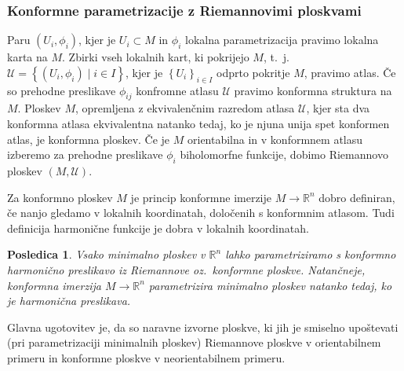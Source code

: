 \documentclass[8pt]{beamer}
\theoremstyle{definition}
\theoremstyle{remark}
\theoremstyle{plain}
\newtheorem{posledica}[definicija]{Posledica}
\numberwithin{equation}{section}  %
\begin{document}
\begin{frame}
    \frametitle{Konformne parametrizacije z Riemannovimi ploskvami}

    Paru $\left(U_i, \phi_i\right)$, kjer je $U_i \subset M$ in $\phi_i$ lokalna parametrizacija pravimo \textcolor{red1}{lokalna karta} na $M$. Zbirki vseh lokalnih kart, ki pokrijejo $M$, t.~j.~$\mathcal{U}=\left\{\left(U_i, \phi_i\right) \mid i \in I\right\}$, kjer je $\left\{U_i\right\}_{i \in I}$ odprto pokritje $M$, pravimo \textcolor{red1}{atlas}. Če so prehodne preslikave $\phi_{ij}$ konfromne atlasu $\mathcal{U}$ pravimo \textcolor{red1}{konformna struktura} na $M$. Ploskev $M$, opremljena z ekvivalenčnim razredom atlasa $\mathcal{U}$, kjer sta dva konformna atlasa ekvivalentna natanko tedaj, ko je njuna unija spet konformen atlas, je \textcolor{red1}{konformna ploskev}. Če je $M$ orientabilna in v konformnem atlasu izberemo za prehodne preslikave $\phi_i$ biholomorfne funkcije, dobimo \textcolor{red1}{Riemannovo ploskev} $(M, \mathcal{U})$. 
    
    \vspace{0.8em}

    Za konformno ploskev $M$ je princip konformne imerzije $M \rightarrow \mathbb{R}^n$ dobro definiran, če nanjo gledamo v lokalnih koordinatah, določenih s konformnim atlasom. Tudi definicija harmonične funkcije je dobra v lokalnih koordinatah.
    \begin{posledica}
        Vsako minimalno ploskev v $\mathbb{R}^n$ lahko parametriziramo s konformno harmonično preslikavo iz Riemannove oz.~konformne ploskve. Natančneje, konformna imerzija $M\rightarrow \mathbb{R}^n$ parametrizira minimalno ploskev natanko tedaj, ko je harmonična preslikava.
    \end{posledica}
    Glavna ugotovitev je, da so naravne izvorne ploskve, ki jih je smiselno upoštevati (pri parametrizaciji minimalnih ploskev) Riemannove ploskve v orientabilnem primeru in konformne ploskve v neorientabilnem primeru. 
    
\end{frame}
\end{document}
